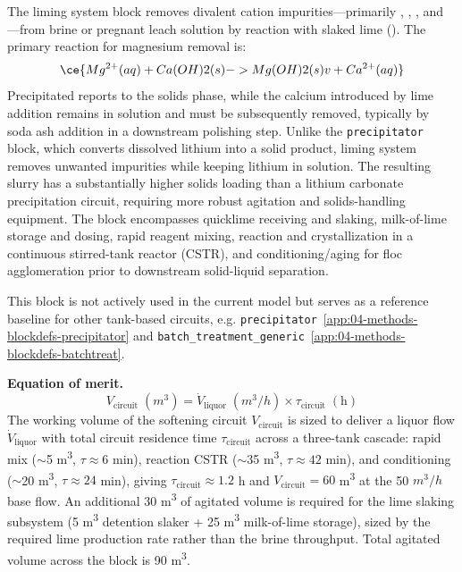 The liming system block removes divalent cation impurities---primarily , , , and ---from brine or pregnant leach solution by reaction with slaked lime (). The primary reaction for magnesium removal is:
\begin{equation}
	\ce{Mg^{2+}(aq) + Ca(OH)2(s) -> Mg(OH)2(s) v + Ca^{2+}(aq)}
\end{equation}
Precipitated  reports to the solids phase, while the calcium introduced by lime addition remains in solution and must be subsequently removed, typically by soda ash addition in a downstream polishing step. Unlike the \texttt{precipitator} block, which converts dissolved lithium into a solid product, liming system removes unwanted impurities while keeping lithium in solution. The resulting slurry has a substantially higher solids loading than a lithium carbonate precipitation circuit, requiring more robust agitation and solids-handling equipment. The block encompasses quicklime receiving and slaking, milk-of-lime storage and dosing, rapid reagent mixing, reaction and crystallization in a continuous stirred-tank reactor (CSTR), and conditioning/aging for floc agglomeration prior to downstream solid-liquid separation.

This block is not actively used in the current model but serves as a reference baseline for other tank-based circuits, e.g. \texttt{precipitator}~\ref{app:04-methods-blockdefs-precipitator} and \texttt{batch\_treatment\_generic}~\ref{app:04-methods-blockdefs-batchtreat}.

\medskip
\noindent\textbf{Equation of merit.}\quad
\[
	V_\text{circuit}\;(\si{m^3}) = \dot{V}_\text{liquor}\;(\si{m^3/h}) \times \tau_\text{circuit}\;(\text{h})
\]
The working volume of the softening circuit $V_\text{circuit}$ is sized to deliver a liquor flow $\dot{V}_\text{liquor}$ with total circuit residence time $\tau_\text{circuit}$ across a three-tank cascade: rapid mix ($\sim$5 \si{m^3}, $\tau \approx 6$ min), reaction CSTR ($\sim$35 \si{m^3}, $\tau \approx 42$ min), and conditioning ($\sim$20 \si{m^3}, $\tau \approx 24$ min), giving $\tau_\text{circuit} \approx 1.2$ h and $V_\text{circuit} = 60$ \si{m^3} at the 50 $\si{m^3/h}$ base flow. An additional 30 \si{m^3} of agitated volume is required for the lime slaking subsystem (5 \si{m^3} detention slaker + 25 \si{m^3} milk-of-lime storage), sized by the required lime production rate rather than the brine throughput. Total agitated volume across the block is 90 \si{m^3}.

